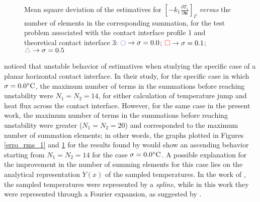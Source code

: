 \documentclass[12pt]{CHT-20}
\begin{document}
\begin{figure}[H]
	\begin{center}			
		\caption{Mean square deviation of the estimatives for $\left[-k_1 \frac{\partial T_1}{\partial \mathbf{n}}\right]_\Gamma$ \textit{versus} the number of  elements in the corresponding summation, for the test problem associated with the contact interface profile 1 and theoretical contact interface 3: $\textcolor{blue}{\ocircle} \rightarrow \sigma = 0.0$; $\textcolor{red}{\square} \rightarrow \sigma = 0.1$; $\textcolor{gray}{\triangle} \rightarrow \sigma = 0.5$}
		\label{erro_rms_2}
	\end{center}
\end{figure}

\cite{artigo_padilha_3} noticed that unstable behavior of estimatives when studying the specific case of a planar horizontal contact interface. In their study, for the specific case in which $\sigma = 0.0\celsius$, the maximum number of terms in the summations before reaching unstability were $N_1=N_2=14$, for either calculation of temperature jump and heat flux across the contact interface. However, for the same case in the present work, the maximum number of terms in the summations before reaching unstability were greater ($N_1=N_2=20$) and corresponded to the maximum number of summation elements; in other words, the graphs plotted in Figures \ref{erro_rms_1} and \ref{erro_rms_2} for the results found by \cite{artigo_padilha_3} would show an ascending behavior starting from $N_1=N_2=14$ for the case $\sigma = 0.0\celsius$. A possible explanation for the improvement in the number of summing elements for this case lies on the analytical representation $Y(x)$ of the sampled temperatures. In the work of \cite{artigo_padilha_3}, the sampled temperatures were represented by a \textit{spline}, while in this work they were represented through a Fourier expansion, as suggested by \cite{artigo_mocerino}.
\end{document}
